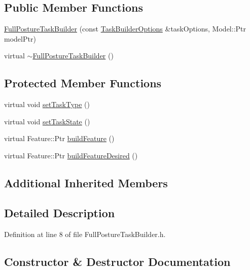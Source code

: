 \subsection*{Public Member Functions}
\begin{DoxyCompactItemize}
\item 
\hyperlink{classocra_1_1FullPostureTaskBuilder_a0b26fe3e55fe1c9881844d34651decea}{Full\+Posture\+Task\+Builder} (const \hyperlink{classocra_1_1TaskBuilderOptions}{Task\+Builder\+Options} \&task\+Options, Model\+::\+Ptr model\+Ptr)
\item 
virtual \hyperlink{classocra_1_1FullPostureTaskBuilder_a4829af35d08e67294aad90e19c70c916}{$\sim$\+Full\+Posture\+Task\+Builder} ()
\end{DoxyCompactItemize}
\subsection*{Protected Member Functions}
\begin{DoxyCompactItemize}
\item 
virtual void \hyperlink{classocra_1_1FullPostureTaskBuilder_a5bae08175fd730b46004ddfccc9a1d8b}{set\+Task\+Type} ()
\item 
virtual void \hyperlink{classocra_1_1FullPostureTaskBuilder_a0f3852057b316baa402806fb320d257b}{set\+Task\+State} ()
\item 
virtual Feature\+::\+Ptr \hyperlink{classocra_1_1FullPostureTaskBuilder_a7651ca4fd2ef7c8096a399b128981122}{build\+Feature} ()
\item 
virtual Feature\+::\+Ptr \hyperlink{classocra_1_1FullPostureTaskBuilder_ac9ea83ee3f872995c6dc214e91fc28a0}{build\+Feature\+Desired} ()
\end{DoxyCompactItemize}
\subsection*{Additional Inherited Members}


\subsection{Detailed Description}


Definition at line 8 of file Full\+Posture\+Task\+Builder.\+h.



\subsection{Constructor \& Destructor Documentation}
\hypertarget{classocra_1_1FullPostureTaskBuilder_a0b26fe3e55fe1c9881844d34651decea}{}\label{classocra_1_1FullPostureTaskBuilder_a0b26fe3e55fe1c9881844d34651decea} 
